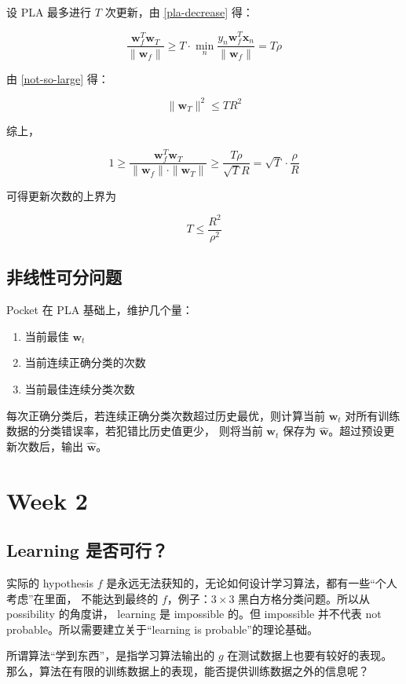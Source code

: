 \documentclass[a4paper]{article}
\begin{document}
设 PLA 最多进行 $T$ 次更新，由 \ref{pla-decrease} 得：

$$\frac{\mathbf{w}_f^T\mathbf{w}_T}{\|\mathbf{w}_f\|} \ge T \cdot \min_{n}\frac{y_n\mathbf{w}_f^T\mathbf{x}_n}{\|\mathbf{w}_f\|} = T\rho$$

由 \ref{not-so-large} 得：

$$\|\mathbf{w}_T\|^2 \le TR^2$$

综上，

$$1 \ge \frac{\mathbf{w}_f^T\mathbf{w}_T}{\|\mathbf{w}_f\| \cdot \|\mathbf{w}_T\|} \ge \frac{T\rho}{\sqrt{T}R} = \sqrt{T} \cdot \frac{\rho}{R}$$

可得更新次数的上界为

$$T \le \frac{R^2}{\rho^2}$$


\subsection{非线性可分问题}
Pocket 在 PLA 基础上，维护几个量：

\begin{enumerate}
  \item 当前最佳 $\mathbf{w}_t$
  \item 当前连续正确分类的次数
  \item 当前最佳连续分类次数
\end{enumerate}

每次正确分类后，若连续正确分类次数超过历史最优，则计算当前 $\mathbf{w}_t$ 对所有训练数据的分类错误率，若犯错比历史值更少，
则将当前 $\mathbf{w}_t$ 保存为 $\hat{\mathbf{w}}$。超过预设更新次数后，输出 $\hat{\mathbf{w}}$。





\section{Week 2}
\subsection{Learning 是否可行？}
实际的 hypothesis $f$ 是永远无法获知的，无论如何设计学习算法，都有一些“个人考虑”在里面，
不能达到最终的 $f$，例子：$3 \times 3$ 黑白方格分类问题。所以从 possibility 的角度讲，
learning 是 impossible 的。但 impossible 并不代表 not probable。所以需要建立关于“learning is probable”的理论基础。

所谓算法“学到东西”，是指学习算法输出的 $g$ 在测试数据上也要有较好的表现。
那么，算法在有限的训练数据上的表现，能否提供训练数据之外的信息呢？
\end{document}
